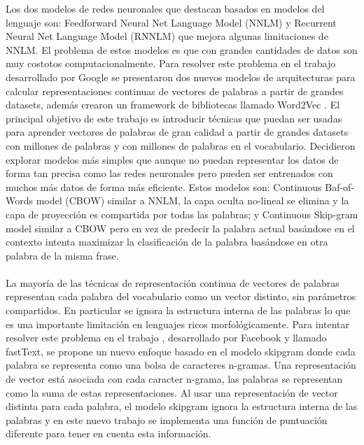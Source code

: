 \documentclass[spanish,12pt, a4paper,twoside]{paper}
\begin{document}
Los dos modelos de redes neuronales que destacan basados en modelos del lenguaje son: Feedforward Neural Net Language Model (NNLM) \cite{bengio:2003} y Recurrent Neural Net Language Model (RNNLM) que mejora algunas limitaciones de NNLM. El problema de estos modelos es que con grandes cantidades de datos son muy costotos computacionalmente. Para resolver este problema en el trabajo \cite{mikolov:2013} desarrollado por Google se presentaron dos nuevos modelos de arquitecturas para calcular representaciones continuas de vectores de palabras a partir de grandes datasets, además crearon un framework de bibliotecas llamado Word2Vec \cite{google:word2vec}. El principal objetivo de este trabajo es introducir técnicas que puedan ser usadas para aprender vectores de palabras de gran calidad a partir de grandes datasets con millones de palabras y con millones de palabras en el vocabulario. Decidieron explorar modelos más simples que aunque no puedan representar los datos de forma tan precisa como las redes neuronales pero pueden ser entrenados con muchos más datos de forma más eficiente. Estos modelos son: Continuous Baf-of-Words model (CBOW) similar a NNLM, la capa oculta no-lineal se elimina y la capa de proyección es compartida por todas las palabras; y Continuous Skip-gram model similar a CBOW pero en vez de predecir la palabra actual basándose en el contexto intenta maximizar la clasificación de la palabra basándose en otra palabra de la misma frase.\\\\

La mayoría de las técnicas de representación continua de vectores de palabras representan cada palabra del vocabulario como un vector distinto, sin parámetros compartidos. En particular se ignora la estructura interna de las palabras lo que es una importante limitación en lenguajes ricos morfológicamente. Para intentar resolver este problema en el trabajo \cite{bojanowski:2017}, desarrollado por Facebook \cite{facebook:fasttext} y llamado fastText, se propone un nuevo enfoque basado en el modelo skipgram \cite{mikolov:2013} donde cada palabra se representa como una bolsa de caracteres n-gramas. Una representación de vector está asociada con cada caracter n-grama, las palabras se representan como la suma de estas representaciones. Al usar una representación de vector distinta para cada palabra, el modelo skipgram ignora la estructura interna de las palabras y en este nuevo trabajo se implementa una función de puntuación diferente para tener en cuenta esta información.
\end{document}
